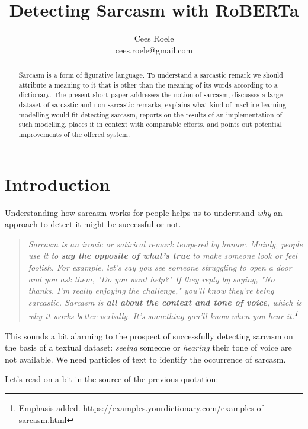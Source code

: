 \documentclass[11pt,a4paper]{article}
\title{Detecting Sarcasm with RoBERTa}
\author{Cees Roele \\
        cees.roele@gmail.com}
\begin{document}
\maketitle
\begin{abstract}
Sarcasm is a form of figurative language. To understand a sarcastic remark we should attribute a meaning to it that is other than the meaning of its words according to a dictionary. 
The present short paper addresses the notion of sarcasm, discusses a large dataset of sarcastic and non-sarcastic remarks, explains what kind of machine learning modelling would fit detecting sarcasm, reports on the results of an implementation of such modelling, places it in context with comparable efforts, and points out potential improvements of the offered system.
\end{abstract}


\section{Introduction}

Understanding how sarcasm works for people helps us to understand \textit{why} an approach to detect it might be successful or not.

\begin{quotation}
\textit{Sarcasm is an ironic or satirical remark tempered by humor. Mainly, people use it to \textbf{say the opposite of what's true} to make someone look or feel foolish. For example, let's say you see someone struggling to open a door and you ask them, "Do you want help?" If they reply by saying, "No thanks. I'm really enjoying the challenge," you'll know they're being sarcastic. Sarcasm is \textbf{all about the context and tone of voice}, which is why it works better verbally. It's something you'll know when you hear it.\footnote{Emphasis added. \url{https://examples.yourdictionary.com/examples-of-sarcasm.html}}}
\end{quotation}

This sounds a bit alarming to the prospect of successfully detecting sarcasm on the basis of a textual dataset: \textit{seeing} someone or \textit{hearing} their tone of voice are not available. We need particles of text to identify the occurrence of sarcasm.\par 

Let's read on a bit in the source of the previous quotation:\par 
\end{document}
